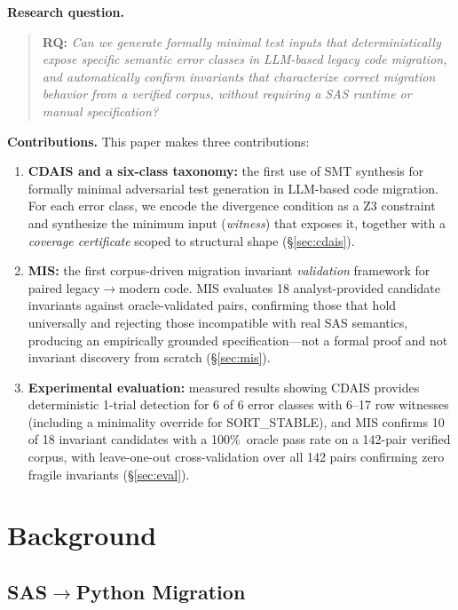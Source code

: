 \documentclass[conference]{IEEEtran}
\begin{document}
\noindent\textbf{Research question.}
\begin{quote}
\textbf{RQ:} \textit{Can we generate formally minimal test inputs that deterministically
expose specific semantic error classes in LLM-based legacy code migration, and
automatically confirm invariants that characterize correct migration behavior from a
verified corpus, without requiring a SAS runtime or manual specification?}
\end{quote}

\noindent\textbf{Contributions.} This paper makes three contributions:
\begin{enumerate}
  \item \textbf{CDAIS and a six-class taxonomy:} the first use of SMT synthesis for
        formally minimal adversarial test generation in LLM-based code migration.
        For each error class, we encode the divergence condition as a Z3 constraint
        and synthesize the minimum input (\emph{witness}) that exposes it, together
        with a \emph{coverage certificate} scoped to structural shape
        (\S\ref{sec:cdais}).
  \item \textbf{MIS:} the first corpus-driven migration invariant \emph{validation}
        framework for paired legacy$\rightarrow$modern code. MIS evaluates 18
        analyst-provided candidate invariants against oracle-validated pairs,
        confirming those that hold universally and rejecting those incompatible with
        real SAS semantics, producing an empirically grounded specification---not a
        formal proof and not invariant discovery from scratch (\S\ref{sec:mis}).
  \item \textbf{Experimental evaluation:} measured results showing CDAIS provides
        deterministic 1-trial detection for 6 of 6 error classes with 6--17 row
        witnesses (including a minimality override for SORT\_STABLE), and MIS
        confirms 10 of 18 invariant candidates with a 100\%~oracle pass rate on
        a 142-pair verified corpus, with leave-one-out cross-validation over all
        142 pairs confirming zero fragile invariants (\S\ref{sec:eval}).
\end{enumerate}


\section{Background}

\subsection{SAS$\rightarrow$Python Migration}
\end{document}
